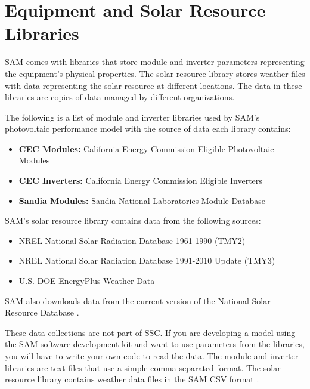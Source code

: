 \documentclass[12pt,letterpaper]{article}
\begin{document}
\section{Equipment and Solar Resource Libraries} \label{sec-libraries}

SAM comes with libraries that store module and inverter parameters representing the equipment's physical properties. The solar resource library stores weather files with data representing the solar resource at different locations. The data in these libraries are copies of data managed by different organizations.

The following is a list of module and inverter libraries used by SAM's photovoltaic performance model with the source of data each library contains:
\begin{itemize}
\item \textbf{CEC Modules:} California Energy Commission Eligible Photovoltaic Modules \citep{gsc2014b}
\item \textbf{CEC Inverters:} California Energy Commission Eligible Inverters \citep{gsc2014c}
\item \textbf{Sandia Modules:} Sandia National Laboratories Module Database \citep{sandia-testeval}
\end{itemize}

SAM's solar resource library contains data from the following sources:
\begin{itemize}
\item NREL National Solar Radiation Database 1961-1990 (TMY2) \citep{nsrdb-old}
\item NREL National Solar Radiation Database 1991-2010 Update (TMY3) \citep{nsrdb-old}
\item U.S. DOE EnergyPlus Weather Data \citep{epw}
\end{itemize}

SAM also downloads data from the current version of the National Solar Resource Database \citep{nsrdb}.

These data collections are not part of SSC. If you are developing a model using the SAM software development kit and want to use parameters from the libraries, you will have to write your own code to read the data. The module and inverter libraries are text files that use a simple comma-separated format. The solar resource library contains weather data files in the SAM CSV format \citep{help-weatherfileformats}.
\end{document}
